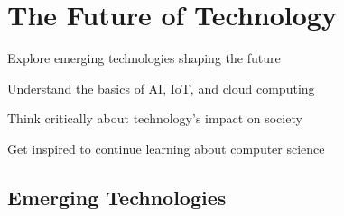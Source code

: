 \chapter{The Future of Technology}
\label{ch:future}

\begin{objectives}
  \item Explore emerging technologies shaping the future
  \item Understand the basics of AI, IoT, and cloud computing
  \item Think critically about technology's impact on society
  \item Get inspired to continue learning about computer science
\end{objectives}


\section{Emerging Technologies}
\label{sec:emerging}

